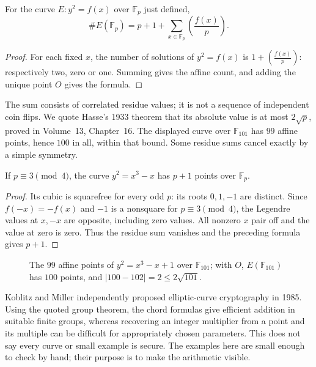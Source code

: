 \begin{proposition}\label{geometry:prop:countEp}
For the curve $E:y^2=f(x)$ over $\mathbb F_p$ just defined,
\[
\#E(\mathbb F_p)=p+1+\sum_{x\in\mathbb F_p}\left(\frac{f(x)}p\right).
\]
\end{proposition}
\begin{proof}
For each fixed $x$, the number of solutions of $y^2=f(x)$ is $1+\left(\frac{f(x)}p\right)$: respectively two, zero or one. Summing gives the affine count, and adding the unique point $O$ gives the formula.
\end{proof}

The sum consists of correlated residue values; it is not a sequence of independent coin flips. We quote Hasse's 1933 theorem that its absolute value is at most $2\sqrt p$, proved in Volume~13, Chapter~16. The displayed curve over $\mathbb F_{101}$ has $99$ affine points, hence $100$ in all, within that bound. Some residue sums cancel exactly by a simple symmetry.

\begin{proposition}\label{geometry:prop:supersingular}
If $p\equiv3\pmod4$, the curve $y^2=x^3-x$ has $p+1$ points over $\mathbb F_p$.
\end{proposition}
\begin{proof}
Its cubic is squarefree for every odd $p$: its roots $0,1,-1$ are distinct. Since $f(-x)=-f(x)$ and $-1$ is a nonsquare for $p\equiv3\pmod4$, the Legendre values at $x,-x$ are opposite, including zero values. All nonzero $x$ pair off and the value at zero is zero. Thus the residue sum vanishes and the preceding formula gives $p+1$.
\end{proof}

\begin{figure}[ht]
\centering
{}
\caption{The $99$ affine points of $y^2=x^3-x+1$ over $\mathbb F_{101}$; with $O$, $E(\mathbb F_{101})$ has $100$ points, and $|100-102|=2\le2\sqrt{101}$.}
\label{geometry:fig:finitecubic}
\end{figure}

\begin{remark}
Koblitz and Miller independently proposed elliptic-curve cryptography in 1985. Using the quoted group theorem, the chord formulas give efficient addition in suitable finite groups, whereas recovering an integer multiplier from a point and its multiple can be difficult for appropriately chosen parameters. This does not say every curve or small example is secure. The examples here are small enough to check by hand; their purpose is to make the arithmetic visible.
\end{remark}

